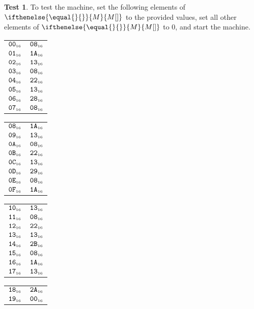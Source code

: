 \documentclass[a4paper,12pt]{article}
\makeatletter
\newcommand{\num}[1]{\texttt{#1}}
\newcommand{\hex}[1]{\num{#1}_{\textup{\tiny 16}}}
\newcommand{\MEM}[1]{\ifthenelse{\equal{#1}{}}{M}{M[#1]}}
\theoremstyle{definition}
\newtheorem{test}{Test}
\newenvironment{memtable}{%
  \begin{trivlist}
    \item
    }{%
    \end{trivlist}}
\newenvironment{memcolumn}{%
  \begin{tabular}{@{}ll@{}}
    \hline}
    {%
    \hline
  \end{tabular}}
\newcommand{\memspace}{\qquad}
\makeatother
\begin{document}
\begin{test}
  To test the machine, set the following elements of $\MEM{}$ to the provided values, set all other elements of $\MEM{}$ to 0, and start the machine.
  \begin{memtable}
    \begin{memcolumn}
      $\hex{00}$ & $\hex{08}$ \\
      $\hex{01}$ & $\hex{1A}$ \\
      $\hex{02}$ & $\hex{13}$ \\
      $\hex{03}$ & $\hex{08}$ \\
      $\hex{04}$ & $\hex{22}$ \\
      $\hex{05}$ & $\hex{13}$ \\
      $\hex{06}$ & $\hex{28}$ \\
      $\hex{07}$ & $\hex{08}$ \\
    \end{memcolumn}
    \memspace
    \begin{memcolumn}
      $\hex{08}$ & $\hex{1A}$ \\
      $\hex{09}$ & $\hex{13}$ \\
      $\hex{0A}$ & $\hex{08}$ \\
      $\hex{0B}$ & $\hex{22}$ \\
      $\hex{0C}$ & $\hex{13}$ \\
      $\hex{0D}$ & $\hex{29}$ \\
      $\hex{0E}$ & $\hex{08}$ \\
      $\hex{0F}$ & $\hex{1A}$ \\
    \end{memcolumn}
    \memspace
    \begin{memcolumn}
      $\hex{10}$ & $\hex{13}$ \\
      $\hex{11}$ & $\hex{08}$ \\
      $\hex{12}$ & $\hex{22}$ \\
      $\hex{13}$ & $\hex{13}$ \\
      $\hex{14}$ & $\hex{2B}$ \\
      $\hex{15}$ & $\hex{08}$ \\
      $\hex{16}$ & $\hex{1A}$ \\
      $\hex{17}$ & $\hex{13}$ \\
    \end{memcolumn}
    \memspace
    \begin{memcolumn}
      $\hex{18}$ & $\hex{2A}$ \\
      $\hex{19}$ & $\hex{00}$ \\

\end{memcolumn}
\end{memtable}
\end{test}
\end{document}
